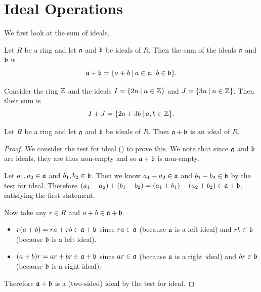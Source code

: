 \section{Ideal Operations}
We first look at the sum of ideals.
\begin{definition}
    Let $R$ be a ring and let $\mathfrak{a}$ and $\mathfrak{b}$ be ideals of $R$. Then the sum of the ideals $\mathfrak{a}$ and $\mathfrak{b}$ is
    \[
        \ideal{a} + \ideal{b} = \{a + b \vert a\in\ideal{a},\;b\in\ideal{b}\}.
    \]
\end{definition}
\begin{example}
    Consider the ring $\mathbb{Z}$ and the ideals $I = \{2n \vert n \in \Z\}$ and $J = \{3n \vert n \in \Z\}$. Then their sum is
    \[
        I + J = \{2a + 3b \vert a,b \in \Z\}.
    \]
\end{example}
\begin{proposition}
    Let $R$ be a ring and let $\mathfrak{a}$ and $\mathfrak{b}$ be ideals of $R$. Then $\mathfrak{a} + \mathfrak{b}$ is an ideal of $R$.
\end{proposition}
\begin{proof}
    We consider the test for ideal () to prove this. We note that since $\mathfrak{a}$ and $\mathfrak{b}$ are ideals, they are thus non-empty and so $\mathfrak{a}+\mathfrak{b}$ is non-empty.

    Let $a_1, a_2 \in \mathfrak{a}$ and $b_1, b_2 \in \mathfrak{b}$. Then we know $a_1 - a_2 \in \mathfrak{a}$ and $b_1 - b_2 \in \mathfrak{b}$ by the test for ideal. Therefore $(a_1 - a_2) + (b_1 - b_2) = (a_1 + b_1) - (a_2 + b_2) \in \mathfrak{a} + \mathfrak{b}$, satisfying the first statement.

    Now take any $r \in R$ and $a+b \in \mathfrak{a}+\mathfrak{b}$.
    \begin{itemize}
        \item $r(a+b) = ra + rb \in \mathfrak{a}+\mathfrak{b}$ since $ra \in \mathfrak{a}$ (because $\mathfrak{a}$ is a left ideal) and $rb \in \mathfrak{b}$ (because $\mathfrak{b}$ is a left ideal).
        \item $(a+b)r = ar + br \in \mathfrak{a}+\mathfrak{b}$ since $ar \in \mathfrak{a}$ (because $\mathfrak{a}$ is a right ideal) and $br \in \mathfrak{b}$ (because $\mathfrak{b}$ is a right ideal).
    \end{itemize}
    Therefore $\mathfrak{a} + \mathfrak{b}$ is a (two-sided) ideal by the test for ideal.
\end{proof}

\newpage

